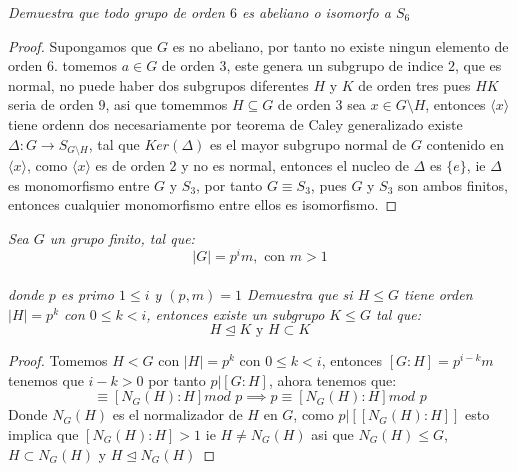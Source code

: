 \documentclass[11pt,letterpaper]{article}
\begin{document}
\begin{tcolorbox}[
	title = \textcolor{black}{\textcolor{white}{Problema 2}},]
\textit{Demuestra que todo grupo de orden $6$ es abeliano o isomorfo a $S_6$
} 
\end{tcolorbox}
\begin{proof}
    Supongamos que $G$ es no abeliano, por tanto no existe ningun elemento de orden $6$. tomemos $a\in G$ de orden $3$, este genera un subgrupo de indice $2$, que es normal, no puede haber dos subgrupos diferentes $H$ y $K$ de orden tres pues $HK$ seria de orden $9$, asi que tomemmos $H\subseteq G$ de orden $3$ sea $x\in G\setminus H$, entonces $\langle x \rangle$ tiene ordenn dos necesariamente 
    por teorema de Caley generalizado existe $\Delta:G\to S_{G\setminus H}$, tal que $Ker(\Delta)$ es el mayor subgrupo normal de $G$ contenido en $\langle x \rangle$, como $\langle x \rangle$ es de orden $2$ y no es normal, entonces el nucleo de $\Delta$ es $\{e\}$, ie $\Delta$ es monomorfismo entre $G$ y $S_3$, por tanto $G\equiv S_3$, pues $G$ y $S_3$ son ambos finitos, entonces cualquier monomorfismo entre ellos es isomorfismo.
\end{proof}
\newpage
\begin{tcolorbox}[
	title = \textcolor{black}{\textcolor{white}{Problema 3}},]
\textit{Sea $G$ un grupo finito, tal que:\,\\
\begin{equation*}
    |G|=p^im,\,\,\text{con}\,\,m>1
\end{equation*}\,\\
donde $p$ es primo $1\leq i$ y $(p,m)=1$
Demuestra que si $H\leq G$ tiene orden $|H|=p^k$ con $0\leq k<i$, entonces existe un subgrupo $K\leq G$ tal que:\,\\
\begin{equation*}
    H\unlhd K\,\,\text{y}\,\,H\subset K
\end{equation*}
} 
\end{tcolorbox}
\begin{proof}
    Tomemos $H<G$ con $|H|=p^k$ con $0\leq k<i$, entonces $[G:H]=p^{i-k}m$ tenemos que $i-k>0$ por tanto $p|[G:H]$, ahora tenemos que:
    \begin{equation*}
        [G:H]\equiv [N_G(H):H] mod\,\,p \implies p\equiv [N_G(H):H] mod\,\,p
    \end{equation*}
    Donde $N_{G}(H)$ es el normalizador de $H$ en $G$, como $p|[[N_G(H):H]]$ esto implica que $[N_G(H):H]>1$ ie $H\neq N_G(H)$
    asi que $N_G(H)\leq G$, $H\subset N_G(H)$ y $H\unlhd N_G(H)$
\end{proof}
\end{document}
